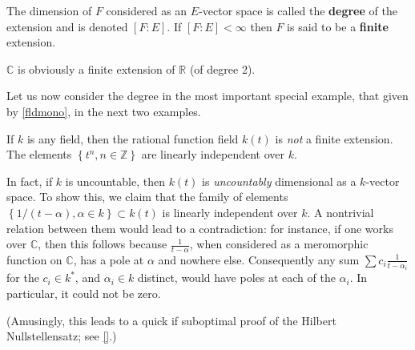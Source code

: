 \begin{definition} 
The dimension of $F$
considered as an $E$-vector space is called the \textbf{degree} of the extension and is
denoted $[F:E]$. If $[F:E]<\infty$ then $F$ is said to be a
\textbf{finite} extension.
\end{definition} 

\begin{example} 
$\mathbb{C}$ is obviously a finite extension of $\mathbb{R}$ (of degree 2).
\end{example} 

Let us now consider the degree in the most important special example, that
given by \cref{fldmono}, in the next two examples.

\begin{example}
\label{monodeg1}
If $k$ is any field, then the rational function field $k(t)$ is \emph{not} a
finite extension. The elements $\left\{t^n, n \in \mathbb{Z}\right\}$
are linearly independent over $k$.

In fact, if $k$ is uncountable, then $k(t)$ is \emph{uncountably} dimensional
as a $k$-vector space. To show this, we claim that the family of elements
$\left\{1/(t- \alpha), \alpha \in k\right\} \subset k(t)$ is linearly independent over $k$. A
nontrivial relation between them would lead to a contradiction: for instance,
if one works over $\mathbb{C}$, then this follows because
$\frac{1}{t-\alpha}$, when considered as a meromorphic function on
$\mathbb{C}$, has a pole at $\alpha$ and nowhere else.
Consequently any sum $\sum c_i \frac{1}{t - \alpha_i}$ for the $c_i \in k^*$,
and $\alpha_i \in k$ distinct, would have poles at each of the $\alpha_i$.
In particular, it could not be zero.

(Amusingly, this leads
to a quick if suboptimal proof of the Hilbert Nullstellensatz; see \cref{}.)
\end{example} 

